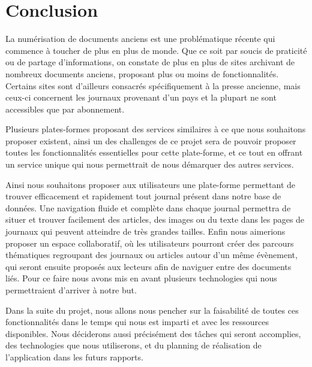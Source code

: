 \section{Conclusion}
\label{Conclusion}
La numérisation de documents anciens est une problématique récente qui commence à toucher de plus en plus de
monde. Que ce soit par soucis de praticité ou de partage d’informations, on constate de plus en plus de sites
archivant de nombreux documents anciens, proposant plus ou moins de fonctionnalités. Certains sites sont d’ailleurs
consacrés spécifiquement à la presse ancienne, mais ceux-ci concernent les journaux provenant d’un pays et la plupart
ne sont accessibles que par abonnement.

Plusieurs plates-formes proposant des services similaires à ce que nous souhaitons proposer existent, ainsi un des
challenges de ce projet sera de pouvoir proposer toutes les fonctionnalités essentielles pour cette plate-forme,
et ce tout en offrant un service unique qui nous permettrait de nous démarquer des autres services.

Ainsi nous souhaitons proposer aux utilisateurs une plate-forme permettant de trouver efficacement et rapidement
tout journal présent dans notre base de données. Une navigation fluide et complète dans chaque journal permettra
de situer et trouver facilement des articles, des images ou du texte dans les pages de journaux qui peuvent atteindre
de très grandes tailles. Enfin nous aimerions proposer un espace collaboratif, où les utilisateurs pourront créer
des parcours thématiques regroupant des journaux ou articles autour d’un même évènement, qui seront ensuite proposés
aux lecteurs afin de naviguer entre des documents liés. Pour ce faire nous avons mis en avant plusieurs technologies
qui nous permettraient d’arriver à notre but.

Dans la suite du projet, nous allons nous pencher sur la faisabilité de toutes ces fonctionnalités dans le temps qui
nous est imparti et avec les ressources disponibles. Nous déciderons aussi précisément des tâches qui seront accomplies,
des technologies que nous utiliserons, et du planning de réalisation de l’application dans les futurs rapports.
